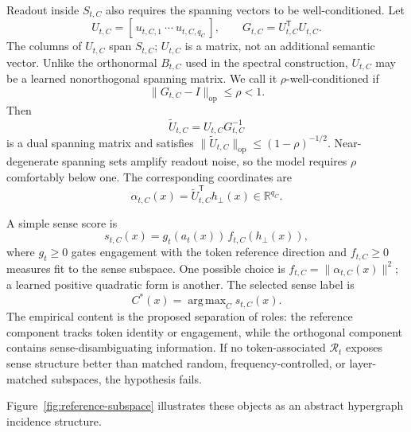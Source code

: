\documentclass[
  aps,
  reprint,
  superscriptaddress,
  floatfix,
  nofootinbib,
  longbibliography
]{revtex4-2}
\newcommand{\R}{\mathbb{R}}
\newcommand{\T}{^{\mathsf{T}}}
\newcommand{\opnorm}[1]{\lVert #1 \rVert_{\mathrm{op}}}
\newcommand{\norm}[1]{\lVert #1 \rVert}
\DeclareMathOperator*{\argmax}{arg\,max}
\begin{document}
Readout inside $S_{t,C}$ also requires the spanning vectors to be
well-conditioned. Let
%
\begin{equation}
U_{t,C}=[\,u_{t,C,1}\ \cdots\ u_{t,C,q_C}\,],
\qquad
G_{t,C}=U_{t,C}\T U_{t,C}.
\end{equation}
%
The columns of $U_{t,C}$ span $S_{t,C}$; $U_{t,C}$ is a matrix, not an
additional semantic vector. Unlike the orthonormal $B_{t,C}$ used in the
spectral construction, $U_{t,C}$ may be a learned nonorthogonal spanning
matrix. We call it $\rho$-well-conditioned if
%
\begin{equation}
\label{eq:rho-stable}
\opnorm{G_{t,C}-I}\le\rho<1.
\end{equation}
%
Then
%
\begin{equation}
\label{eq:dual-spanning}
\widetilde U_{t,C}=U_{t,C}G_{t,C}^{-1}
\end{equation}
%
is a dual spanning matrix and satisfies
$\opnorm{\widetilde U_{t,C}}\le(1-\rho)^{-1/2}$. Near-degenerate spanning
sets amplify readout noise, so the model requires $\rho$ comfortably below
one. The corresponding coordinates are
%
\begin{equation}
\label{eq:alpha}
\alpha_{t,C}(x)=\widetilde U_{t,C}\T h_\perp(x)
\in\R^{q_C}.
\end{equation}
%

A simple sense score is
%
\begin{equation}
\label{eq:sense-score}
s_{t,C}(x)=g_t(a_t(x))\,f_{t,C}(h_\perp(x)),
\end{equation}
%
where $g_t\ge0$ gates engagement with the token reference direction and
$f_{t,C}\ge0$ measures fit to the sense subspace. One possible choice is
$f_{t,C}=\norm{\alpha_{t,C}(x)}^2$; a learned positive quadratic form is
another. The selected sense label is
%
\begin{equation}
\label{eq:selected-sense}
C^*(x)=\argmax_C s_{t,C}(x).
\end{equation}
%
The empirical content is the proposed separation of roles: the reference
component tracks token identity or engagement, while the orthogonal
component contains sense-disambiguating information. If no token-associated
$\mathcal R_t$ exposes sense structure better than matched random,
frequency-controlled, or layer-matched subspaces, the hypothesis fails.

Figure~\ref{fig:reference-subspace} illustrates these objects as an abstract
hypergraph incidence structure.
\end{document}
